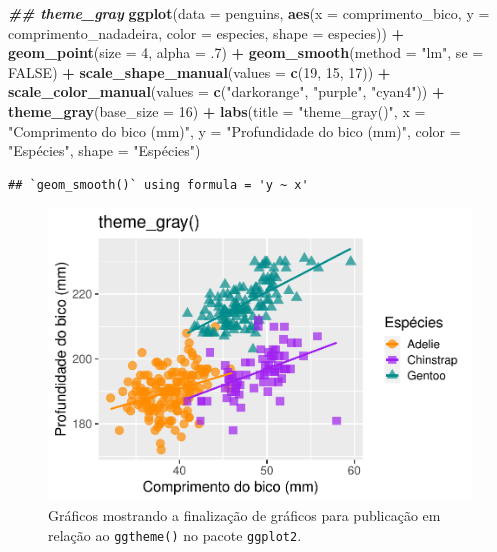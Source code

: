 \documentclass[
]{article}
\newenvironment{Shaded}{\begin{snugshade}}{\end{snugshade}}
\newcommand{\AttributeTok}[1]{\textcolor[rgb]{0.13,0.29,0.53}{#1}}
\newcommand{\ConstantTok}[1]{\textcolor[rgb]{0.56,0.35,0.01}{#1}}
\newcommand{\DecValTok}[1]{\textcolor[rgb]{0.00,0.00,0.81}{#1}}
\newcommand{\DocumentationTok}[1]{\textcolor[rgb]{0.56,0.35,0.01}{\textbf{\textit{#1}}}}
\newcommand{\FunctionTok}[1]{\textcolor[rgb]{0.13,0.29,0.53}{\textbf{#1}}}
\newcommand{\NormalTok}[1]{#1}
\newcommand{\SpecialCharTok}[1]{\textcolor[rgb]{0.81,0.36,0.00}{\textbf{#1}}}
\newcommand{\StringTok}[1]{\textcolor[rgb]{0.31,0.60,0.02}{#1}}
\begin{document}
\begin{Shaded}
\begin{Highlighting}[]
\DocumentationTok{\#\# theme\_gray}
\FunctionTok{ggplot}\NormalTok{(}\AttributeTok{data =}\NormalTok{ penguins, }
       \FunctionTok{aes}\NormalTok{(}\AttributeTok{x =}\NormalTok{ comprimento\_bico, }\AttributeTok{y =}\NormalTok{ comprimento\_nadadeira,}
           \AttributeTok{color =}\NormalTok{ especies, }\AttributeTok{shape =}\NormalTok{ especies)) }\SpecialCharTok{+}
    \FunctionTok{geom\_point}\NormalTok{(}\AttributeTok{size =} \DecValTok{4}\NormalTok{, }\AttributeTok{alpha =}\NormalTok{ .}\DecValTok{7}\NormalTok{) }\SpecialCharTok{+}
    \FunctionTok{geom\_smooth}\NormalTok{(}\AttributeTok{method =} \StringTok{"lm"}\NormalTok{, }\AttributeTok{se =} \ConstantTok{FALSE}\NormalTok{) }\SpecialCharTok{+}
    \FunctionTok{scale\_shape\_manual}\NormalTok{(}\AttributeTok{values =} \FunctionTok{c}\NormalTok{(}\DecValTok{19}\NormalTok{, }\DecValTok{15}\NormalTok{, }\DecValTok{17}\NormalTok{)) }\SpecialCharTok{+}
    \FunctionTok{scale\_color\_manual}\NormalTok{(}\AttributeTok{values =} \FunctionTok{c}\NormalTok{(}\StringTok{"darkorange"}\NormalTok{, }\StringTok{"purple"}\NormalTok{, }\StringTok{"cyan4"}\NormalTok{)) }\SpecialCharTok{+}
    \FunctionTok{theme\_gray}\NormalTok{(}\AttributeTok{base\_size =} \DecValTok{16}\NormalTok{) }\SpecialCharTok{+}
    \FunctionTok{labs}\NormalTok{(}\AttributeTok{title =} \StringTok{"theme\_gray()"}\NormalTok{, }\AttributeTok{x =} \StringTok{"Comprimento do bico (mm)"}\NormalTok{, }
         \AttributeTok{y =} \StringTok{"Profundidade do bico (mm)"}\NormalTok{, }\AttributeTok{color =} \StringTok{"Espécies"}\NormalTok{, }\AttributeTok{shape =} \StringTok{"Espécies"}\NormalTok{) }
\end{Highlighting}
\end{Shaded}

\begin{verbatim}
## `geom_smooth()` using formula = 'y ~ x'
\end{verbatim}

\begin{figure}
\centering
\includegraphics{epr_files/figure-latex/fig-plot-final-ggtheme-1.pdf}
\caption{\label{fig:fig-plot-final-ggtheme-1}Gráficos mostrando a finalização de gráficos para publicação em relação ao \texttt{ggtheme()} no pacote \texttt{ggplot2}.}
\end{figure}
\end{document}

